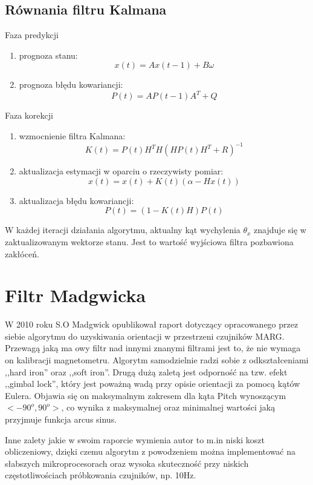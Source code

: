 \subsection{Równania filtru Kalmana}

Faza predykcji
\begin{enumerate}
    \item prognoza stanu: $$x(t) = Ax(t-1) + B \omega$$
    \item prognoza błędu kowariancji: $$P(t) = AP(t-1)A^T+Q$$
\end{enumerate}
%
Faza korekcji
\begin{enumerate}
    \item wzmocnienie filtra Kalmana: $$K(t) = P(t)H^TH(HP(t)H^T+R)^{-1}$$
    \item aktualizacja estymacji w oparciu o rzeczywisty pomiar: $$x(t) = x(t) + K(t)(\alpha - Hx(t))$$
    \item aktualizacja błędu kowariancji: $$P(t) = (1 - K(t)H)P(t)$$
\end{enumerate}

W każdej iteracji działania algorytmu, aktualny kąt wychylenia $\theta_x$ znajduje się w zaktualizowanym wektorze stanu. Jest to wartość wyjściowa filtra pozbawiona zakłóceń.

\section{Filtr Madgwicka}

W 2010 roku S.O Madgwick opublikował raport \cite{Madgwick2010AnEO} dotyczący opracowanego przez siebie algorytmu do uzyskiwania orientacji w przestrzeni czujników MARG. Przewagą jaką ma owy filtr nad innymi znanymi filtrami jest to, że nie wymaga on kalibracji magnetometru. Algorytm samodzielnie radzi sobie z odkształceniami ,,hard iron'' oraz ,,soft iron''. Drugą dużą zaletą jest odporność na tzw. efekt ,,gimbal lock'', który jest poważną wadą przy opisie orientacji za pomocą kątów Eulera. Objawia się on maksymalnym zakresem dla kąta Pitch wynoszącym $<-90^o, 90^o>$, co wynika z maksymalnej oraz minimalnej wartości jaką przyjmuje funkcja arcus sinus.

Inne zalety jakie w swoim raporcie wymienia autor to m.in niski koszt obliczeniowy, dzięki czemu algorytm z powodzeniem można implementować na słabszych mikroprocesorach oraz wysoka skuteczność przy niskich częstotliwościach próbkowania czujników, np. 10Hz.

